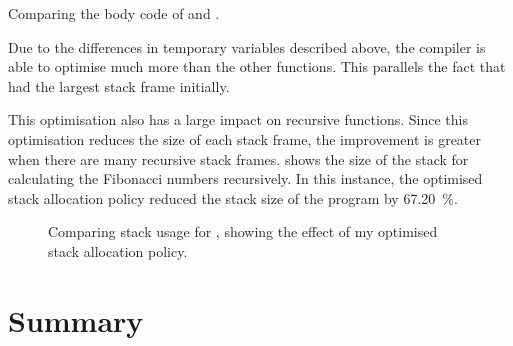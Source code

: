 \documentclass[00-main.tex]{subfiles}
\begin{document}

\begin{listing}[b]
  \hfill
  \par\smallskip
  \caption{Comparing the body code of  and .\bigskip}
  \label{lst:caseupper and casecamel body code}
\end{listing}

Due to the differences in temporary variables described above, the compiler is able to optimise  much more than the other functions.
This parallels the fact that  had the largest stack frame initially.


This optimisation also has a large impact on recursive functions.
Since this optimisation reduces the size of each stack frame, the improvement is greater when there are many recursive stack frames.
 shows the size of the stack for calculating the Fibonacci numbers recursively.
In this instance, the optimised stack allocation policy reduced the stack size of the program by \SI{67.20}{\percent}.


\begin{figure}[!b]
  \centering
  \caption{Comparing stack usage for , showing the effect of my optimised stack allocation policy.}
  \label{fig:comparing stack usage for fibonacci.c} %
\end{figure}



\section{Summary}
\end{document}
